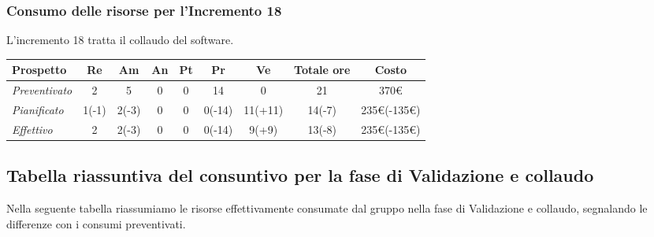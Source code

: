 {{{{{{{{{{{{{{{{{{\subsubsection{Consumo delle risorse per l'Incremento 18}
L'incremento 18 tratta il collaudo del software.
\quad
\def\tabularxcolumn#1{m{#1}}
{

	\begin{center}
		\renewcommand{\arraystretch}{1.4}
		\begin{tabularx}{\textwidth}{|X|c|c|c|c|c|c|c|c|}
			\hline
			\rowcolor{airforceblue}
			\textbf{Prospetto} & \textbf{Re} & \textbf{Am} & \textbf{An} & \textbf{Pt} & \textbf{Pr} & \textbf{Ve} & \textbf{Totale ore} & \textbf{Costo} \\
			\hline
			\textit{Preventivato}& 2 & 5 & 0 & 0 & 14 & 0 & 21 & 370\euro\\
			\hline
			\textit{Pianificato} & 1(-1) & 2(-3) & 0 & 0 & 0(-14) & 11(+11) & 14(-7) & 235\euro(-135\euro) \\
			\hline
			\textit{Effettivo} & 2 & 2(-3) & 0 & 0 & 0(-14) & 9(+9) & 13(-8) & 235\euro(-135\euro) \\
			\hline
		\end{tabularx}
	\end{center}


\clearpage
\subsection{Tabella riassuntiva del consuntivo per la fase di Validazione e collaudo}

Nella seguente tabella riassumiamo le risorse effettivamente consumate dal gruppo nella fase di Validazione e collaudo, segnalando le differenze con i consumi preventivati.

\quad
\def\tabularxcolumn#1{m{#1}}
{

}}}}}}}}}}}}}}}}}}}}
